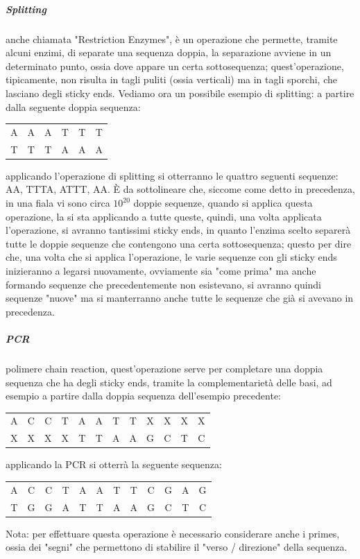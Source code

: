 \documentclass[12pt,a4paper]{report}
\begin{document}
\subparagraph{Splitting}
anche chiamata "Restriction Enzymes", è un operazione che permette, tramite alcuni enzimi, di separate una sequenza doppia, la separazione avviene in un determinato punto, ossia dove appare un certa sottosequenza; quest'operazione, tipicamente, non risulta in tagli puliti (ossia verticali) ma in tagli sporchi, che lasciano degli sticky ends. Vediamo ora un possibile esempio di splitting: a partire dalla seguente doppia sequenza: 
\begin{center}
\begin{tabular}{ c c c c c c }
 A & A & A & T & T & T \\ 
 T & T & T & A & A & A
\end{tabular}
\end{center}
applicando l'operazione di splitting si otterranno le quattro seguenti sequenze:
AA, TTTA, ATTT, AA. È da sottolineare che, siccome come detto in precedenza, in una fiala vi sono circa $10^{20}$ doppie sequenze, quando si applica questa operazione, la si sta applicando a tutte queste, quindi, una volta applicata l'operazione, si avranno tantissimi sticky ends, in quanto l'enzima scelto separerà tutte le doppie sequenze che contengono una certa sottosequenza; questo per dire che, una volta che si applica l'operazione, le varie sequenze con gli sticky ends inizieranno a legarsi nuovamente, ovviamente sia "come prima" ma anche formando sequenze che precedentemente non esistevano, si avranno quindi sequenze "nuove" ma si manterranno anche tutte le sequenze che già si avevano in precedenza.

\subparagraph{PCR}
polimere chain reaction, quest'operazione serve per completare una doppia sequenza che ha degli sticky ends, tramite la complementarietà delle basi, ad esempio a partire dalla doppia sequenza dell'esempio precedente:
\begin{center}
\begin{tabular}{ c c c c c c c c c c c c }
 A & C & C & T & A & A & T & T & X & X & X & X \\ 
 X & X & X & X & T & T & A & A & G & C & T & C
\end{tabular}
\end{center}
applicando la PCR si otterrà la seguente sequenza:
\begin{center}
\begin{tabular}{ c c c c c c c c c c c c }
 A & C & C & T & A & A & T & T & C & G & A & G \\ 
 T & G & G & A & T & T & A & A & G & C & T & C
\end{tabular}
\end{center}
Nota: per effettuare questa operazione è necessario considerare anche i primes, ossia dei "segni" che permettono di stabilire il "verso / direzione" della sequenza.
\end{document}
